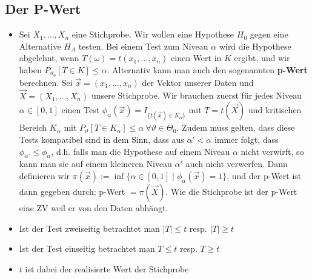 \subsection{Der P-Wert}
\begin{itemize}
    \item Sei $X_1, \dots, X_n$ eine Stichprobe. Wir wollen eine Hypothese $H_0$ gegen eine Alternative $H_A$ testen. Bei einem Test zum Niveau $\alpha$ wird die Hypothese abgelehnt, wenn $T(\omega) = t(x_1, \dots, x_n)$ einen Wert in $K$ ergibt, und wir haben $P_{\vartheta_0} [T \in K] \le \alpha$. Alternativ kann man auch den sogenannten \textbf{p-Wert} berechnen. Sei $\overrightarrow{x} = (x_1, \dots, x_n)$ der Vektor unserer Daten und $\overrightarrow{X} = (X_1, \dots, X_n)$ unsere Stichprobe. Wir brauchen zuerst für jedes Niveau $\alpha \in [0, 1]$ einen Test $\phi_\alpha(\overrightarrow{x}) = I_{\{t(\overrightarrow{x}) \in K_\alpha\} }$ mit $T = t(\overrightarrow{X})$ und kritischen Bereich $K_\alpha$ mit $P_\vartheta[T \in K_\alpha] \le \alpha \ \forall \vartheta \in \Theta_0$. Zudem muss gelten, dass diese Tests kompatibel sind in dem Sinn, dass aus $\alpha' < \alpha$ immer folgt, dass $\phi_{\alpha'} \le \phi_\alpha$, d.h. falls man die Hypothese auf einem Niveau $\alpha$ nicht verwirft, so kann man sie auf einem kleineren Niveau $\alpha'$ auch nicht verwerfen. Dann definieren wir $\pi(\overrightarrow{x}) := \inf \{\alpha \in [0, 1] \mid \phi_\alpha(\overrightarrow{x}) = 1\}$, und der p-Wert ist dann gegeben durch; p-Wert $= \pi(\overrightarrow{X})$. Wie die Stichprobe ist der p-Wert eine ZV weil er von den Daten abhängt.
    \item Ist der Test zweiseitig betrachtet man $|T| \le t$ resp. $|T| \ge t$
    \item Ist der Test einseitig betrachtet man $T \le t$ resp. $T \ge t$
    \item $t$ ist dabei der realisierte Wert der Stichprobe
\end{itemize}

